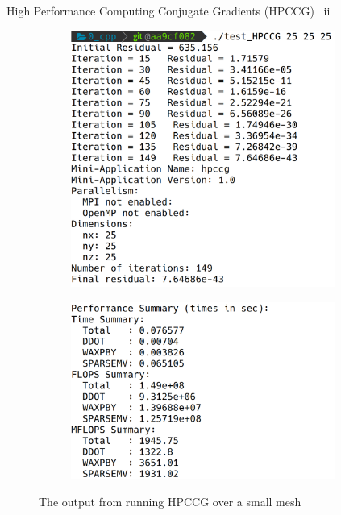 \documentclass[10pt,aspectratio=169]{beamer}
\begin{document}
\begin{frame}{High Performance Computing Conjugate Gradients (HPCCG) \ ii}
    \begin{figure}
        \begin{subfigure}[c]{.45\textwidth}\centering
            \includegraphics[width=0.95\textwidth]{images/hpccg-run.png}
            \label{fig:hpccg-run}
        \end{subfigure}%
        \begin{subfigure}[c]{.45\textwidth}\centering
            \includegraphics[width=0.95\textwidth]{images/hpccg-perf.png}
            \label{fig:hpccg-perf}
        \end{subfigure}
        \caption{The output from running HPCCG over a small mesh}
    \end{figure}
\end{frame}
\end{document}
